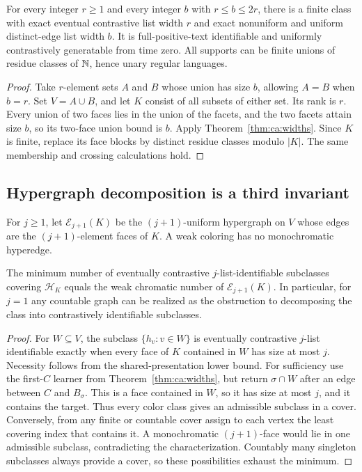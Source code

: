 \begin{corollary}\label{cor:ca:two}
For every integer $r\ge1$ and every integer $b$ with $r\le b\le2r$, there is a finite class with exact eventual contrastive list width $r$ and exact nonuniform and uniform distinct-edge list width $b$. It is full-positive-text identifiable and uniformly contrastively generatable from time zero. All supports can be finite unions of residue classes of $\mathbb N$, hence unary regular languages.
\end{corollary}
\begin{proof}
Take $r$-element sets $A$ and $B$ whose union has size $b$, allowing $A=B$ when $b=r$. Set $V=A\cup B$, and let $K$ consist of all subsets of either set. Its rank is $r$. Every union of two faces lies in the union of the facets, and the two facets attain size $b$, so its two-face union bound is $b$. Apply Theorem~\ref{thm:ca:widths}. Since $K$ is finite, replace its face blocks by distinct residue classes modulo $|K|$. The same membership and crossing calculations hold.
\end{proof}

\subsection{Hypergraph decomposition is a third invariant}
For $j\ge1$, let $\mathcal E_{j+1}(K)$ be the $(j+1)$-uniform hypergraph on $V$ whose edges are the $(j+1)$-element faces of $K$. A weak coloring has no monochromatic hyperedge.

\begin{theorem}\label{thm:ca:coloring}
The minimum number of eventually contrastive $j$-list-identifiable subclasses covering $\mathcal H_K$ equals the weak chromatic number of $\mathcal E_{j+1}(K)$. In particular, for $j=1$ any countable graph can be realized as the obstruction to decomposing the class into contrastively identifiable subclasses.
\end{theorem}
\begin{proof}
For $W\subseteq V$, the subclass $\{h_v:v\in W\}$ is eventually contrastive $j$-list identifiable exactly when every face of $K$ contained in $W$ has size at most $j$. Necessity follows from the shared-presentation lower bound. For sufficiency use the first-$C$ learner from Theorem~\ref{thm:ca:widths}, but return $\sigma\cap W$ after an edge between $C$ and $B_\sigma$. This is a face contained in $W$, so it has size at most $j$, and it contains the target. Thus every color class gives an admissible subclass in a cover. Conversely, from any finite or countable cover assign to each vertex the least covering index that contains it. A monochromatic $(j+1)$-face would lie in one admissible subclass, contradicting the characterization. Countably many singleton subclasses always provide a cover, so these possibilities exhaust the minimum.
\end{proof}

